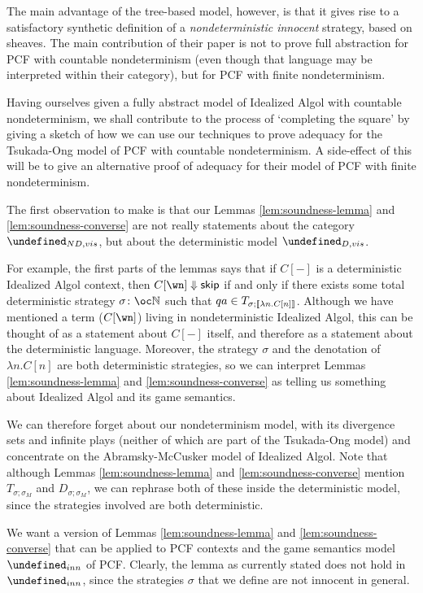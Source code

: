 \documentclass[sigplan,9pt,review]{acmart}\settopmatter{printfolios=true,printccs=false,printacmref=false}
\let\G\undefined
\begin{document}
The main advantage of the tree-based model, however, is that it gives rise to a satisfactory synthetic definition of a \emph{nondeterministic innocent} strategy, based on sheaves.  
The main contribution of their paper is not to prove full abstraction for PCF with countable nondeterminism (even though that language may be interpreted within their category), but for PCF with finite nondeterminism.  

Having ourselves given a fully abstract model of Idealized Algol with countable nondeterminism, we shall contribute to the process of `completing the square' by giving a sketch of how we can use our techniques to prove adequacy for the Tsukada-Ong model of PCF with countable nondeterminism.  
A side-effect of this will be to give an alternative proof of adequacy for their model of PCF with finite nondeterminism.  

The first observation to make is that our Lemmas \ref{lem:soundness-lemma} and \ref{lem:soundness-converse} are not really statements about the category $\G_{ND,vis}$, but about the deterministic model $\G_{D,vis}$.  

For example, the first parts of the lemmas says that if $C[-]$ is a deterministic Idealized Algol context, then $C[\wn]\converges\skipp$ if and only if there exists some total deterministic strategy $\sigma\from\oc\bN$ such that $qa\in T_{\sigma;\left\llbracket\lambda n.C[n]\right\rrbracket}$.  
Although we have mentioned a term ($C[\wn]$) living in nondeterministic Idealized Algol, this can be thought of as a statement about $C[-]$ itself, and therefore as a statement about the deterministic language.
Moreover, the strategy $\sigma$ and the denotation of $\lambda n.C[n]$ are both deterministic strategies, so we can interpret Lemmas \ref{lem:soundness-lemma} and \ref{lem:soundness-converse} as telling us something about Idealized Algol and its game semantics.  

We can therefore forget about our nondeterminism model, with its divergence sets and infinite plays (neither of which are part of the Tsukada-Ong model) and concentrate on the Abramsky-McCusker model of Idealized Algol.
Note that although Lemmas \ref{lem:soundness-lemma} and \ref{lem:soundness-converse} mention $T_{\sigma;\sigma_M}$ and $D_{\sigma;\sigma_M}$, we can rephrase both of these inside the deterministic model, since the strategies involved are both deterministic.  

We want a version of Lemmas \ref{lem:soundness-lemma} and \ref{lem:soundness-converse} that can be applied to PCF contexts and the game semantics model $\G_{inn}$ of PCF.  
Clearly, the lemma as currently stated does not hold in $\G_{inn}$, since the strategies $\sigma$ that we define are not innocent in general.  
\end{document}
